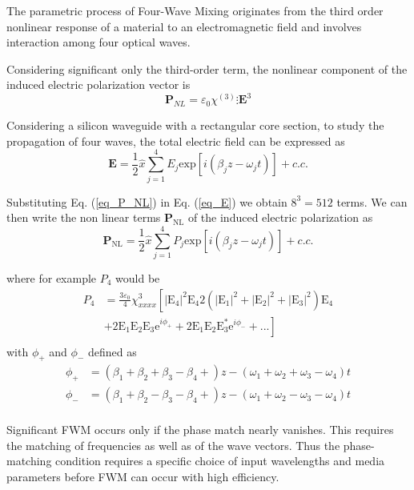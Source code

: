 \documentclass[12pt,a4paper,twoside]{article}
\begin{document}
The parametric process of Four-Wave Mixing originates from the third order nonlinear response of a material to an electromagnetic field and involves interaction among four optical waves.

Considering significant only the third-order term, the nonlinear component of the induced electric polarization vector is
\begin{equation}
	\textbf{P}_{NL} = \varepsilon_0 \chi^{(3)} \vdots \textbf{E}^3
	\label{eq_P_NL}
\end{equation}

Considering a silicon waveguide with a rectangular core section, to study the propagation of four waves, the total electric field can be expressed as
\begin{equation}
	\textbf{E} = \frac{1}{2}\hat{x} \sum_{j=1}^4 E_j \mathrm{exp}[i(\beta_j z - \omega_j t)] + c.c.
	\label{eq_E}
\end{equation}

Substituting Eq. (\ref{eq_P_NL}) in Eq. (\ref{eq_E}) we obtain $8^3=512$ terms.
We can then write the non linear terms $\mathrm{\textbf{P}_{NL}}$ of the induced electric polarization as
\begin{equation}
	\mathrm{\textbf{P}_{NL}} = \frac{1}{2}\hat{x} \sum_{j=1}^4 P_j \mathrm{exp}[i(\beta_j z - \omega_j t)] + c.c.
	\label{eq_P}
\end{equation}

where for example $P_4$ would be
\[
\begin{array}{rl}
	P_4 &= \frac{3\varepsilon_0}{4} \chi^3_{xxxx}\left[ |\mathrm{E}_4|^2\mathrm{E}_4 2(|\mathrm{E}_1|^2+|\mathrm{E}_2|^2+|\mathrm{E}_3|^2)\mathrm{E}_4 \right. \\
	&+ \left. 2\mathrm{E}_1\mathrm{E}_2\mathrm{E}_3\mathrm{e}^{i\phi_+}+2\mathrm{E}_1\mathrm{E}_2\mathrm{E}_3^*\mathrm{e}^{i\phi_-} + ...\right]\\

\end{array}
\]
\hspace{18pt}with $\phi_+$ and $\phi_-$ defined as
\[
\begin{array}{lr}
\phi_+ &= (\beta_1+\beta_2+\beta_3-\beta_4+)z - (\omega_1+\omega_2+\omega_3-\omega_4)t \\
\phi_- &= (\beta_1+\beta_2-\beta_3-\beta_4+)z - (\omega_1+\omega_2-\omega_3-\omega_4)t \\
\end{array}
\]

Significant FWM occurs only if the phase match nearly vanishes.
This requires the matching of frequencies as well as of the wave vectors.
Thus the phase-matching condition requires a specific choice of input wavelengths and media parameters before FWM can occur with high efficiency.
\end{document}
